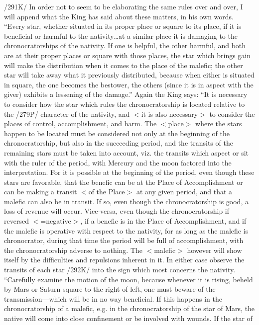 /291K/ In order not to seem to be elaborating the same rules over and over, I will append what the
King has said about these matters, in his own words.
“Every star, whether situated in its proper place or square to its place, if it is beneficial or harmful
to the nativity…at a similar place it is damaging to the chronocratorships of the nativity. If one is
helpful, the other harmful, and both are at their proper places or square with those places, the star
which brings gain will make the distribution when it comes to the place of the malefic; the other star
will take away what it previously distributed, because when either is situated in square, the one
becomes the bestower, the others (since it is in aspect with the giver) exhibits a lessening of the
damage.”
Again the King says:
“It is necessary to consider how the star which rules the chronocratorship is located relative to the
/279P/ character of the nativity, and $<$it is also necessary$>$ to consider the places of control,
accomplishment, and harm. The $<$place$>$ where the stars happen to be located must be considered
not only at the beginning of the chronocratorship, but also in the succeeding period, and the transits
of the remaining stars must be taken into account, viz. the transits which aspect or sit with the ruler
of the period, with Mercury and the moon factored into the interpretation. For it is possible at the
beginning of the period, even though these stars are favorable, that the benefic can be at the Place of
Accomplishment or can be making a transit $<$of the Place$>$ at any given period, and that a malefic
can also be in transit. If so, even though the chronocratorship is good, a loss of revenue will occur.
Vice-versa, even though the chronocratorship if reversed $<$=negative$>$, if a benefic is in the Place of
Accomplishment, and if the malefic is operative with respect to the nativity, for as long as the
malefic is chronocrator, during that time the period will be full of accomplishment, with the
chronocratorship adverse to nothing. The $<$malefic$>$ however will show itself by the difficulties and
repulsions inherent in it. In either case observe the transits of each star /292K/ into the sign which
most concerns the nativity.
“Carefully examine the motion of the moon, because whenever it is rising, beheld by Mars or
Saturn square to the right of left, one must beware of the transmission—which will be in no way
beneficial. If this happens in the chronocratorship of a malefic, e.g. in the chronocratorship of the star
of Mars, the native will come into close confinement or be involved with wounds. If the star of
